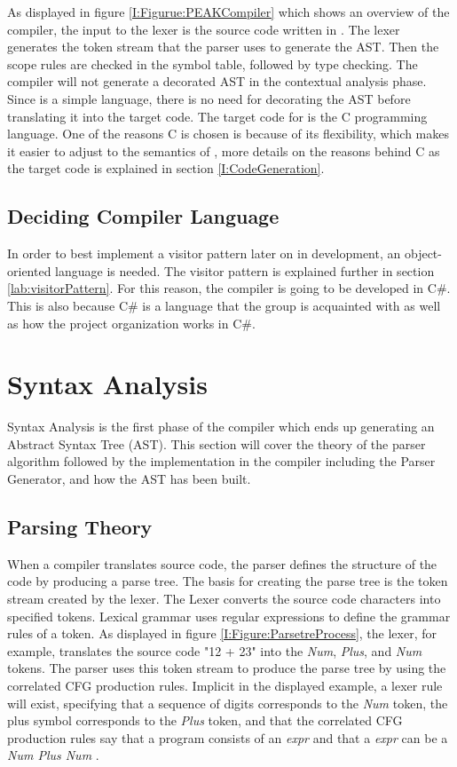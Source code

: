\noindent As displayed in figure \ref{I:Figurue:PEAKCompiler} which shows an overview of the \lang compiler, the input to the lexer is the source code written in \lang. The lexer generates the token stream that the parser uses to generate the AST. Then the scope rules are checked in the symbol table, followed by type checking. The \lang compiler will not generate a decorated AST in the contextual analysis phase. Since \lang is a simple language, there is no need for decorating the AST before translating it into the target code. The target code for \lang is the C programming language. One of the reasons C is chosen is because of its flexibility, which makes it easier to adjust to the semantics of \lang, more details on the reasons behind C as the target code is explained in section \ref{I:CodeGeneration}.

\subsection{Deciding Compiler Language} \label{I:TargetLanguage}
In order to best implement a visitor pattern later on in development, an object-oriented language is needed. The visitor pattern is explained further in section \ref{lab:visitorPattern}. For this reason, the \lang compiler is going to be developed in C\#. This is also because C\# is a language that the group is acquainted with as well as how the project organization works in C\#. 

\section{Syntax Analysis}\label{I:SyntaxAnalysis}
Syntax Analysis is the first phase of the compiler which ends up generating an Abstract Syntax Tree (AST). This section will cover the theory of the parser algorithm followed by the implementation in the \lang compiler including the Parser Generator, and how the AST has been built. 

\subsection{Parsing Theory}
When a compiler translates source code, the parser defines the structure of the code by producing a parse tree. The basis for creating the parse tree is the token stream created by the lexer. The Lexer converts the source code characters into specified tokens. Lexical grammar uses regular expressions to define the grammar rules of a token. As displayed in figure \ref{I:Figure:ParsetreProcess}, the lexer, for example, translates the source code "12 + 23" into the \textit{Num}, \textit{Plus}, and \textit{Num} tokens. The parser uses this token stream to produce the parse tree by using the correlated CFG production rules. Implicit in the displayed example, a lexer rule will exist, specifying that a sequence of digits corresponds to the \textit{Num} token, the plus symbol corresponds to the \textit{Plus} token, and that the correlated CFG production rules say that a program consists of an \textit{expr} and that a \textit{expr} can be a \textit{Num Plus Num} \cite{ParsingGuide}. 

